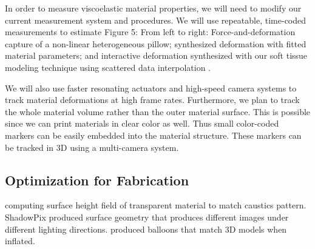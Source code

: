 \documentclass[annual]{acmsiggraph}
\begin{document}
In order to measure viscoelastic material properties, we will need to modify our current measurement
system and procedures. We will use repeatable, time-coded measurements to estimate
Figure 5: From left to right: Force-and-deformation capture of a non-linear heterogeneous pillow;
synthesized deformation with fitted material parameters; and interactive deformation synthesized
with our soft tissue modeling technique using scattered data interpolation \cite{Bickel:2010}.

We will also use faster resonating actuators and high-speed
camera systems to track material deformations at high frame rates. Furthermore, we plan to track
the whole material volume rather than the outer material surface. This is possible since we can
print materials in clear color as well. Thus small color-coded markers can be easily embedded into
the material structure. These markers can be tracked in 3D using a multi-camera system.
\subsection{Optimization for Fabrication}
\cite{Finckh:2010} computing surface height field
of transparent material to match caustics pattern.
ShadowPix \cite{Bermano:2012} produced surface geometry
that produces different images 
under different lighting
directions. \cite{sko:2012} produced balloons that match 3D models when
inflated.
\end{document}
